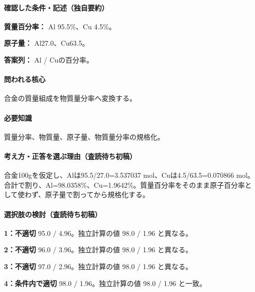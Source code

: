 \paragraph{確認した条件・記述（独自要約）}\mbox{}\par

\noindent\textbf{質量百分率：} Al 95.5\%、Cu 4.5\%。\par

\noindent\textbf{原子量：} Al27.0、Cu63.5。\par

\noindent\textbf{答案列：} Al / Cuの百分率。\par

\paragraph{問われる核心} 合金の質量組成を物質量分率へ変換する。

\paragraph{必要知識} 質量分率、物質量、原子量、物質量分率の規格化。

\paragraph{考え方・正答を選ぶ理由（査読待ち初稿）} 合金100gを仮定し、Alは95.5/27.0=\allowbreak{}3.537037 mol、Cuは4.5/63.5=\allowbreak{}0.070866 mol。合計で割り、Al=\allowbreak{}98.0358\%、Cu=\allowbreak{}1.9642\%。質量百分率をそのまま原子百分率として使わず、原子量で割ってから規格化する。

\paragraph{選択肢の検討（査読待ち初稿）}\mbox{}\par

\noindent\textbf{1：不適切} 95.0 / 4.96。独立計算の値 98.0 / 1.96 と異なる。\par

\noindent\textbf{2：不適切} 96.0 / 3.96。独立計算の値 98.0 / 1.96 と異なる。\par

\noindent\textbf{3：不適切} 97.0 / 2.96。独立計算の値 98.0 / 1.96 と異なる。\par

\noindent\textbf{4：条件内で適切} 98.0 / 1.96。独立計算の値 98.0 / 1.96 と一致。\par

